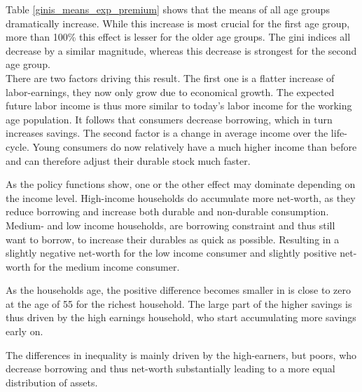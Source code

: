 \documentclass[a4paper,12pt,legno]{article}
\begin{document}
Table \ref{ginis_means_exp_premium} shows that the means of all age groups dramatically increase. While this increase is most crucial for the first age group, more than 100\% this effect is lesser for the older age groups. The gini indices all decrease by a similar magnitude, whereas this decrease is strongest for the second age group. \\

There are two factors driving this result. The first one is a flatter increase of labor-earnings, they now only grow due to economical growth. The expected future labor income is thus more similar to today's labor income for the working age population. It follows that consumers decrease borrowing, which in turn increases savings. The second factor is a change in average income over the life-cycle. Young consumers do now relatively have a much higher income than before and can therefore adjust their durable stock much faster. 

As the policy functions show, one or the other effect may dominate depending on the income level. High-income households do accumulate more net-worth, as they reduce borrowing and increase both durable and non-durable consumption. Medium- and low income households, are borrowing constraint and thus still want to borrow, to increase their durables as quick as possible. Resulting in a slightly negative net-worth for the low income consumer and slightly positive net-worth for the medium income consumer. 

As the households age, the positive difference becomes smaller in is close to zero at the age of 55 for the richest household. 
The large part of the higher savings is thus driven by the high earnings household, who start accumulating more savings early on. 

The differences in inequality is mainly driven by the high-earners, but poors, who decrease borrowing and thus net-worth substantially leading to a more equal distribution of assets. 
\end{document}
